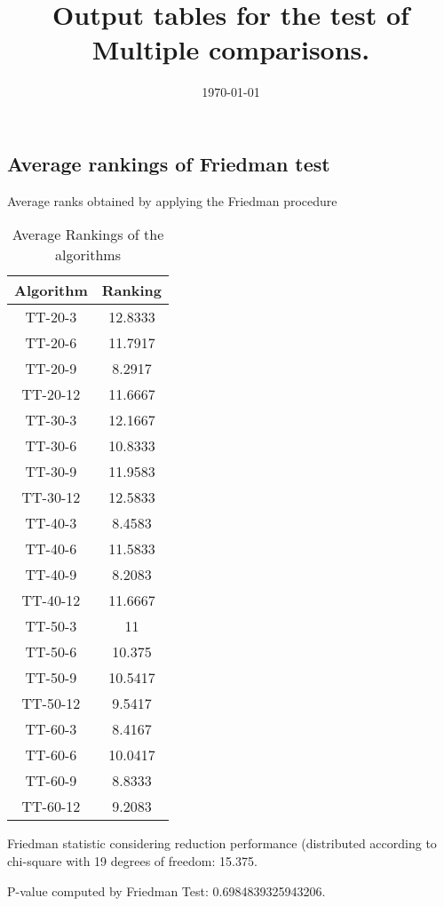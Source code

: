 \documentclass[a4paper,10pt]{article}
\title{Output tables for the test of Multiple comparisons.}
\author{}
\date{\today}
\begin{document}
\begin{landscape}
\pagestyle{empty}
\maketitle
\thispagestyle{empty}
\section{Average rankings of Friedman test}



Average ranks obtained by applying the Friedman procedure

\begin{table}[!htp]
\centering
\begin{tabular}{|c|c|}\hline
Algorithm&Ranking\\\hline
TT-20-3 & 12.8333\\
TT-20-6 & 11.7917\\
TT-20-9 & 8.2917\\
TT-20-12 & 11.6667\\
TT-30-3 & 12.1667\\
TT-30-6 & 10.8333\\
TT-30-9 & 11.9583\\
TT-30-12 & 12.5833\\
TT-40-3 & 8.4583\\
TT-40-6 & 11.5833\\
TT-40-9 & 8.2083\\
TT-40-12 & 11.6667\\
TT-50-3 & 11\\
TT-50-6 & 10.375\\
TT-50-9 & 10.5417\\
TT-50-12 & 9.5417\\
TT-60-3 & 8.4167\\
TT-60-6 & 10.0417\\
TT-60-9 & 8.8333\\
TT-60-12 & 9.2083\\
\hline
\end{tabular}
\caption{Average Rankings of the algorithms}
\end{table}

Friedman statistic considering reduction performance (distributed according to chi-square with 19 degrees of freedom: 15.375.

P-value computed by Friedman Test: 0.6984839325943206.\newline




\end{landscape}
\end{document}
